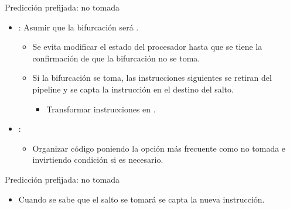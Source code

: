 \begin{frame}[t]{Predicción prefijada: no tomada}
\begin{itemize}
  \item {}: Asumir que la bifurcación será .
    \begin{itemize}
      \item Se evita modificar el estado del procesador hasta que 
            se tiene la confirmación de que la bifurcación no se toma.
      \item Si la bifurcación se toma, las instrucciones siguientes se 
            retiran del pipeline y se capta la instrucción en el destino del salto.
        \begin{itemize}
          \item Transformar instrucciones en .
        \end{itemize}
    \end{itemize}

  \item {}:
    \begin{itemize}
      \item Organizar código poniendo la opción más frecuente como no tomada e invirtiendo condición si es necesario.
    \end{itemize}
\end{itemize}
\end{frame}

\begin{frame}[t]{Predicción prefijada: no tomada}
\makebox[\textwidth][c]{

}
\begin{itemize}
  \item Cuando se sabe que el salto se tomará se capta la nueva instrucción.
\end{itemize}
\end{frame}

